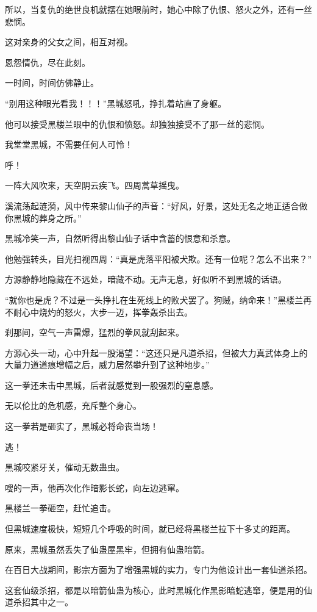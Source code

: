 \begin{this_body}
所以，当复仇的绝世良机就摆在她眼前时，她心中除了仇恨、怒火之外，还有一丝悲悯。

这对亲身的父女之间，相互对视。

恩怨情仇，尽在此刻。

一时间，时间仿佛静止。

“别用这种眼光看我！！！”黑城怒吼，挣扎着站直了身躯。

他可以接受黑楼兰眼中的仇恨和愤怒。却独独接受不了那一丝的悲悯。

我堂堂黑城，不需要任何人可怜！

呼！

一阵大风吹来，天空阴云疾飞。四周蒿草摇曳。

溪流荡起涟漪，风中传来黎山仙子的声音：“好风，好景，这处无名之地正适合做你黑城的葬身之所。”

黑城冷笑一声，自然听得出黎山仙子话中含蓄的恨意和杀意。

他勉强转头，目光扫视四周：“真是虎落平阳被犬欺。还有一位呢？怎么不出来？”

方源静静地隐藏在不远处，暗藏不动。无声无息，好似听不到黑城的话语。

“就你也是虎？不过是一头挣扎在生死线上的败犬罢了。狗贼，纳命来！”黑楼兰再不耐心中烧灼的怒火，大步一迈，挥拳轰杀出去。

刹那间，空气一声雷爆，猛烈的拳风就刮起来。

方源心头一动，心中升起一股渴望：“这还只是凡道杀招，但被大力真武体身上的大量力道道痕增幅之后，威力居然攀升到了这种地步。”

这一拳还未击中黑城，后者就感觉到一股强烈的窒息感。

无以伦比的危机感，充斥整个身心。

这一拳若是砸实了，黑城必将命丧当场！

逃！

黑城咬紧牙关，催动无数蛊虫。

嗖的一声，他再次化作暗影长蛇，向左边逃窜。

黑楼兰一拳砸空，赶忙追击。

但黑城速度极快，短短几个呼吸的时间，就已经将黑楼兰拉下十多丈的距离。

原来，黑城虽然丢失了仙蛊屋黑牢，但拥有仙蛊暗箭。

在百日大战期间，影宗方面为了增强黑城的实力，专门为他设计出一套仙道杀招。

这套仙级杀招，都是以暗箭仙蛊为核心，此时黑城化作黑影暗蛇逃窜，便是用的仙道杀招其中之一。


\end{this_body}
